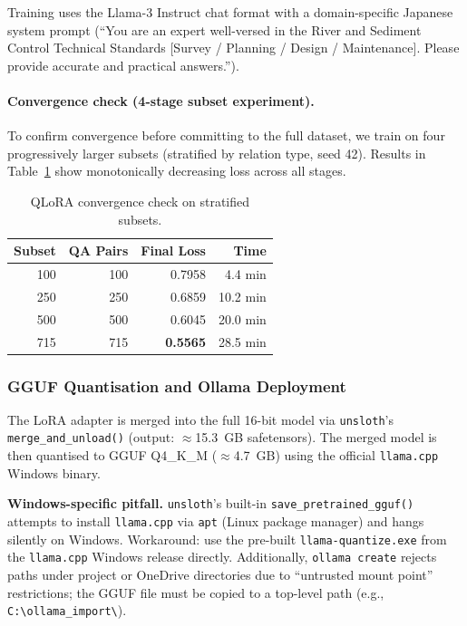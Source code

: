 \documentclass[twocolumn]{article}
\begin{document}
Training uses the Llama-3 Instruct chat format with a domain-specific Japanese system prompt
(``You are an expert well-versed in the River and Sediment Control Technical Standards
[Survey / Planning / Design / Maintenance]. Please provide accurate and practical answers.'').

\paragraph{Convergence check (4-stage subset experiment).}
To confirm convergence before committing to the full dataset,
we train on four progressively larger subsets (stratified by relation type, seed 42).
Results in Table~\ref{tab:convergence} show monotonically decreasing loss across all stages.

\begin{table}[H]
  \centering
  \caption{QLoRA convergence check on stratified subsets.}
  \label{tab:convergence}
  \begin{tabular}{rrrr}
    \toprule
    Subset & QA Pairs & Final Loss & Time \\
    \midrule
    100 & 100 & 0.7958 & 4.4 min \\
    250 & 250 & 0.6859 & 10.2 min \\
    500 & 500 & 0.6045 & 20.0 min \\
    715 & 715 & \textbf{0.5565} & 28.5 min \\
    \bottomrule
  \end{tabular}
\end{table}

\subsubsection{GGUF Quantisation and Ollama Deployment}

The LoRA adapter is merged into the full 16-bit model via \texttt{unsloth}'s
\texttt{merge\_and\_unload()} (output: $\approx$15.3~GB safetensors).
The merged model is then quantised to GGUF Q4\_K\_M ($\approx$4.7~GB) using the
official \texttt{llama.cpp} Windows binary.

\noindent\textbf{Windows-specific pitfall.}
\texttt{unsloth}'s built-in \texttt{save\_pretrained\_gguf()} attempts to install
\texttt{llama.cpp} via \texttt{apt} (Linux package manager) and hangs silently on Windows.
Workaround: use the pre-built \texttt{llama-quantize.exe} from the \texttt{llama.cpp}
Windows release directly.
Additionally, \texttt{ollama create} rejects paths under project or OneDrive directories
due to ``untrusted mount point'' restrictions;
the GGUF file must be copied to a top-level path (e.g., \texttt{C:\textbackslash{}ollama\_import\textbackslash}).
\end{document}
